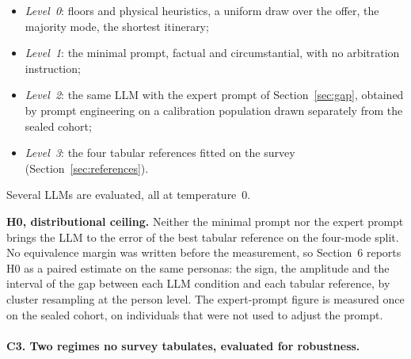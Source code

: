 \begin{itemize}
  \item \emph{Level~0}: floors and physical heuristics, a uniform draw over the offer, the majority mode, the shortest itinerary;
  \item \emph{Level~1}: the minimal prompt, factual and circumstantial, with no arbitration instruction;
  \item \emph{Level~2}: the same LLM with the expert prompt of Section~\ref{sec:gap}, obtained by prompt engineering on a calibration population drawn separately from the sealed cohort;
  \item \emph{Level~3}: the four tabular references fitted on the survey (Section~\ref{sec:references}).
\end{itemize}

Several LLMs are evaluated, all at temperature~0.

\textbf{H0, distributional ceiling.} Neither the minimal prompt nor the expert prompt brings the LLM to the error of the best tabular reference on the four-mode split. No equivalence margin was written before the measurement, so Section~6 reports H0 as a paired estimate on the same personas: the sign, the amplitude and the interval of the gap between each LLM condition and each tabular reference, by cluster resampling at the person level.
The expert-prompt figure is measured once on the sealed cohort, on individuals that were not used to adjust the prompt.

\paragraph{C3. Two regimes no survey tabulates, evaluated for robustness.}

